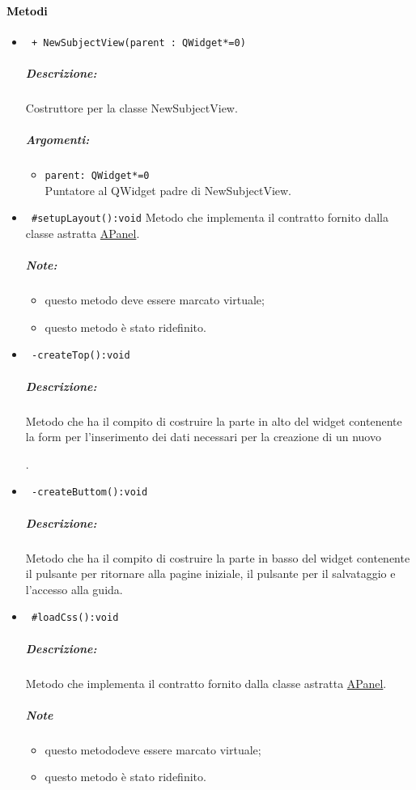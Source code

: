 \paragraph{\textcolor{black}{Metodi\\}}
\begin{itemize}
\item \color{blue}\verb! + NewSubjectView(parent : QWidget*=0)!
\color{black}
\subparagraph{Descrizione: }
Costruttore per la classe NewSubjectView.
\subparagraph{Argomenti:}
\begin{itemize}
\item \color{RoyalPurple}\verb!parent: QWidget*=0 ! \\ Puntatore al QWidget padre di NewSubjectView.
\end{itemize}

\item \color{blue}\verb! #setupLayout():void!
\color{black}
Metodo che implementa il contratto fornito dalla classe astratta \hyperref[speAPanel]{APanel}.\\
\subparagraph{Note: }
\begin{itemize}
\item questo metodo deve essere marcato virtuale;
\item questo metodo è stato ridefinito.
\end{itemize}

\item \color{blue}\verb! -createTop():void!
\color{black}
\subparagraph{Descrizione: }
Metodo che ha il compito di costruire la parte in alto del widget contenente la form per l'inserimento dei dati necessari per la creazione di un nuovo \subject{}.
 
\item \color{blue}\verb! -createButtom():void!
\color{black}
\subparagraph{Descrizione: }
Metodo che ha il compito di costruire la parte in basso del widget contenente il pulsante per ritornare alla pagine iniziale, il pulsante per il salvataggio e l'accesso alla guida.

\item \color{blue}\verb! #loadCss():void!
\color{black}
\subparagraph{Descrizione: }
 Metodo che implementa il contratto fornito dalla classe astratta \hyperref[speAPanel]{APanel}.\\
 \subparagraph{Note}
 \begin{itemize}
  \item questo metododeve essere marcato virtuale;
 \item questo metodo è stato ridefinito.
 \end{itemize}
 

\end{itemize}
